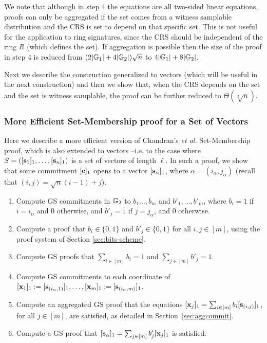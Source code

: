 We note that although in step 4 the equations are all two-sided linear equations, proofs can only be aggregated if the set comes from a witness samplable distribution and the CRS is set to depend on that specific set. 
This is not useful for the application 
to ring signatures, since the CRS should be independent of the ring $R$ (which defines the set). If aggregation is possible then the size of the proof in step 4 is reduced from $(2|\mathbb{G}_1|+4|\mathbb{G}_2|)\sqrt{n}$ to $4|\mathbb{G}_1|+8|\mathbb{G}_2|$.

Next we describe the construction generalized to vectors (which will be useful in the next construction) and then we show that,
when the CRS depends on the set and the set is witness samplable, the proof can be further reduced to $\Theta(\sqrt[3]{n})$.

\subsubsection{More Efficient Set-Membership proof for a Set of Vectors}  
Here we describe a more efficient version of Chandran's \textit{et al.} Set-Membership proof,  
which is also extended to vectors --i.e. to the case where $S=([\mathbf{s}_1]_1,\ldots,[\mathbf{s}_n]_1)$ is a set of vectors of length $\ell$. In such a proof, we show that some commitment $[\mathbf{c}]_1$ opens to a vector $[\mathbf{s}_{\alpha}]_1$, where $\alpha=(i_\alpha,j_\alpha)$ (recall that $(i,j)=\sqrt{n}(i-1)+j$).

\begin{enumerate}
\item Compute GS commitments in $\mathbb{G}_2$ to $b_1\ldots,b_m$ and $b'_1,\ldots,b'_m$,
      where $b_i = 1$ if $i=i_\alpha$ and $0$ otherwise, and $b'_{j}=1$ if $j=j_\alpha$, and $0$ otherwise.
\item Compute a proof that $b_i \in \{0,1\}$ and $b'_j \in \{0,1\}$ for all $i,j\in[m]$, using the proof system of Section \ref{sec:bits-scheme}.
\item Compute GS proofs that $\sum_{i\in[m]}b_i=1$ and $\sum_{j\in[m]}b'_j=1$. 
\item Compute GS commitments to each coordinate of $[\mathbf{x}_1]_1:=[\mathbf{s}_{(i_\alpha,1)}]_1,\ldots,\allowbreak[\mathbf{x}_m]_1:=[\mathbf{s}_{(i_\alpha,m)}]_1$.
\item Compute an aggregated GS proof that the equations $[\mathbf{x}_j]_1 = \sum_{i\in[m]}b_i[\mathbf{s}_{(i,j)}]_1$, for all $j\in[m]$, are satisfied, as detailed in Section~\ref{sec:aggcommit}.
\item Compute a GS proof that $[\mathbf{s}_{\alpha}]_1 = \sum_{j\in[m]}b'_j[\mathbf{x}_j]_1$ is satisfied.
\end{enumerate}

